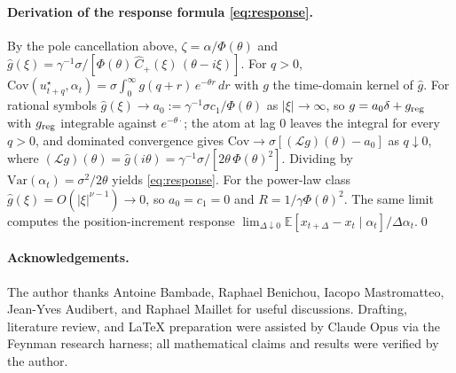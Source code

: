\documentclass[11pt]{article}
\newcommand{\E}{\mathbb{E}}
\theoremstyle{plain}
\begin{document}
\paragraph{Derivation of the response formula \eqref{eq:response}.} By the pole cancellation above, $\zeta = \alpha/\Phi(\theta)$ and $\hat g(\xi) = \gamma^{-1}\sigma/[\Phi(\theta)\,\hat C_+(\xi)\,(\theta-i\xi)]$. For $q>0$, $\mathrm{Cov}(u^\star_{t+q},\alpha_t) = \sigma\int_0^\infty g(q+r)\,e^{-\theta r}\,dr$ with $g$ the time-domain kernel of $\hat g$. For rational symbols $\hat g(\xi)\to a_0 := \gamma^{-1}\sigma c_1/\Phi(\theta)$ as $|\xi|\to\infty$, so $g = a_0\delta + g_{\rm reg}$ with $g_{\rm reg}$ integrable against $e^{-\theta\cdot}$; the atom at lag $0$ leaves the integral for every $q>0$, and dominated convergence gives $\mathrm{Cov}\to\sigma[(\mathcal Lg)(\theta) - a_0]$ as $q\downarrow0$, where $(\mathcal Lg)(\theta) = \hat g(i\theta) = \gamma^{-1}\sigma/[2\theta\,\Phi(\theta)^2]$. Dividing by $\mathrm{Var}(\alpha_t) = \sigma^2/2\theta$ yields \eqref{eq:response}. For the power-law class $\hat g(\xi) = O(|\xi|^{\nu-1})\to0$, so $a_0 = c_1 = 0$ and $R = 1/\gamma\Phi(\theta)^2$. The same limit computes the position-increment response $\lim_{\Delta\downarrow0}\E[x_{t+\Delta}-x_t\mid\alpha_t]/\Delta\alpha_t$.\qed

\paragraph{Acknowledgements.} The author thanks Antoine Bambade, Raphael Benichou, Iacopo Mastromatteo, Jean-Yves Audibert, and Raphael Maillet for useful discussions. Drafting, literature review, and LaTeX preparation were assisted by Claude Opus via the Feynman research harness; all mathematical claims and results were verified by the author.



\end{document}
